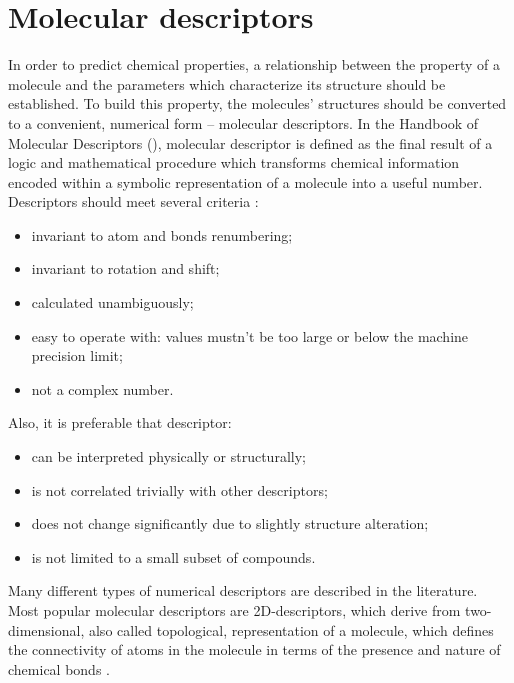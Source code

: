 \section{Molecular descriptors}
  In order to predict chemical properties, a relationship between the property of a molecule and the parameters which characterize its structure should be established.
  To build this property, the molecules' structures should be converted to a convenient, numerical form -- molecular descriptors.
  In the Handbook of Molecular Descriptors ({\cite{Todeschini2007MethodsChemistry}}),
  molecular descriptor is defined as the final result of a logic and mathematical procedure which transforms chemical information encoded within a symbolic representation of a molecule into a useful number. \\

\noindent Descriptors should meet several criteria {\cite{
Baskin2020IntroductionRussian}}:
\begin{itemize}
    \item invariant to atom and bonds renumbering;
    \item invariant to rotation and shift;
    \item calculated unambiguously;
    \item easy to operate with: values mustn't be too large or below the machine precision limit;
    \item not a complex number.
\end{itemize}
\hfill\break
Also, it is preferable that descriptor:
\begin{itemize}
    \item can be interpreted physically or structurally;
    \item is not correlated trivially with other descriptors;
    \item does not change significantly due to slightly structure alteration;
    \item is not limited to a small subset of compounds.
\end{itemize}

\noindent Many different types of numerical descriptors are described in the literature. 
Most popular molecular descriptors are 2D-descriptors, which derive from two-dimensional, also called topological, representation of a molecule, which defines the connectivity of atoms in the molecule in terms of the presence and nature of chemical bonds {\cite{Cherkasov2014QSARTo}}. 

